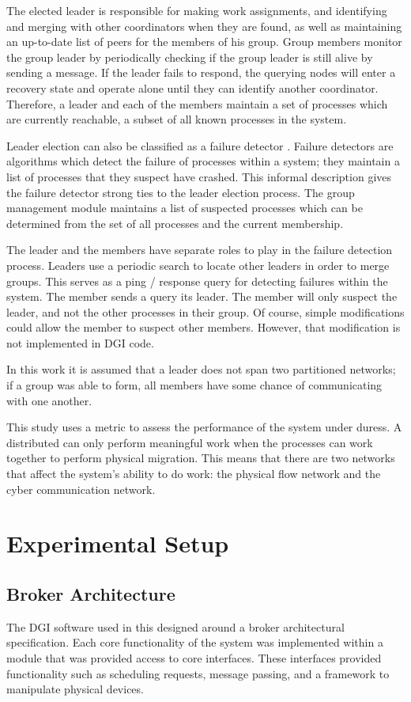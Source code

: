 The elected leader is responsible for making work assignments, and identifying and merging with other coordinators when they are found, as well as maintaining an up-to-date list of peers for the members of his group. 
Group members monitor the group leader by periodically checking if the group leader is still alive by sending a message. 
If the leader fails to respond, the querying nodes will enter a recovery state and operate alone until
they can identify another coordinator.
Therefore, a leader and each of the members maintain a set of processes which are currently reachable, a subset of all known processes in the system.

Leader election can also be classified as a failure detector \cite{LEADERELECTIONEVAL}.
Failure detectors are algorithms which detect the failure of processes within a system; they maintain a list of processes that they suspect have crashed.
This informal description gives the failure detector strong ties to the leader election process. 
The group management module maintains a list of suspected processes which can be determined from the set of all processes and the current membership.

The leader and the members have separate roles to play in the failure detection process.
Leaders use a periodic search to locate other leaders in order to merge groups.
This serves as a ping / response query for detecting failures within the system.
The member sends a query its leader.
The member will only suspect the leader, and not the other processes in their group.
Of course, simple modifications could allow the member to suspect other members.
However, that modification is not implemented in DGI code.

In this work it is assumed that a leader does not span two partitioned networks; if a group was able to form, all members have some chance of communicating with one another.

This study uses a metric to assess the performance of the system under duress.
A distributed can only perform meaningful work when the processes can work together to perform physical migration.
This means that there are two networks that affect the system's ability to do work: the physical flow network and the cyber communication network.

\section {Experimental Setup}

\subsection{Broker Architecture}
The DGI software used in this designed around a broker architectural specification.
Each core functionality of the system was implemented within a module that was provided access to core interfaces.
These interfaces provided functionality such as scheduling requests, message passing, and a framework to manipulate physical devices.

